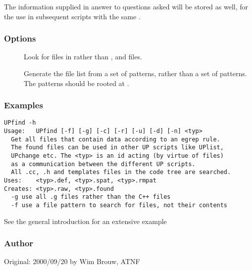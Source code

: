 \noindent
The information supplied in answer to questions asked will be stored as well,
for the use in subsequent scripts with the same .

\subsubsection*{Options}

\begin{description}
\item[]
    Look for files in  rather than ,  and
     files.
\item[]
    Generate the file list from a set of  patterns, rather than a
    set of  patterns. The  patterns should be rooted at
    . 
\end{description}

\subsubsection*{Examples}

\begin{verbatim}
UPfind -h
Usage:   UPfind [-f] [-g] [-c] [-r] [-u] [-d] [-n] <typ>
  Get all files that contain data according to an egrep rule.
  The found files can be used in other UP scripts like UPlist, 
  UPchange etc. The <typ> is an id acting (by virtue of files) 
  as a communication between the different UP scripts.
  All .cc, .h and templates files in the code tree are searched.
Uses:    <typ>.def, <typ>.spat, <typ>.rmpat
Creates: <typ>.raw, <typ>.found
  -g use all .g files rather than the C++ files
  -f use a file pattern to search for files, not their contents
\end{verbatim}

\noindent
See the general introduction for an extensive example 

\subsubsection*{Author}

Original: 2000/09/20 by Wim Brouw, ATNF


\newpage

\subsection{}
\label{UPlist}

